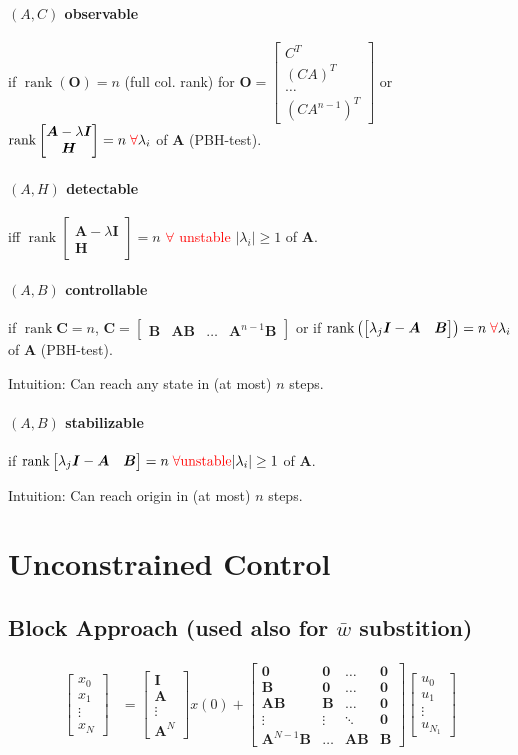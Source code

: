 \documentclass[landscape,a4paper,8pt]{scrartcl}
\newcommand{\remph}[1]{{\textcolor{red}{#1}}}
\newcommand\vA{\bm{A}}
\newcommand\vB{\bm{B}}
\newcommand\vC{\bm{C}}
\newcommand\vH{\bm{H}}
\newcommand\vI{\bm{I}}
\newcommand\vO{\bm{O}}
\newcommand{\Me}[1]{\begin{bmatrix}#1\end{bmatrix}} %
\DeclareMathOperator\rank{rank}
\begin{document}
\begin{multicols*}{3}
\paragraph{$(A,C)$ observable}
if $\rank(\vO) = n$ (full col. rank) for
$\vO = \Me{C^T \\ (CA)^T \\ \dots \\ (CA^{n-1})^T}$ or $\rank\Me{\vA-\lambda\vI \\ \vH} = n \; \remph{\forall} \lambda_i$ of $\vA$ (PBH-test).
\paragraph{$(A,H)$ detectable}
iff $\rank\Me{\vA-\lambda\vI \\ \vH} = n$ \remph{$\forall$ unstable} $|\lambda_i| \geq 1$ of $\vA$.

\paragraph{$(A,B)$ controllable}
if $\rank\vC = n$,
$\vC = \Me{\vB & \vA\vB & \dots & \vA^{n-1}\vB}$
or
if $\rank\left(\Me{\lambda_j \vI - \vA & \vB}\right) = n\; \remph{\forall} \lambda_i$ of $\vA$ (PBH-test).

Intuition: Can reach any state in (at most) $n$ steps.

\paragraph{$(A,B)$ stabilizable}
if $\rank\Me{\lambda_j \vI - \vA & \vB} = n \; \remph{\forall \text{unstable}} |\lambda_i| \geq 1$ of $\vA$.

Intuition: Can reach origin in (at most) $n$ steps.

\section{Unconstrained Control}
\subsection{Block Approach (used also for $\bar w$ substition)}
\begin{align*}
		\Me{x_0 \\ x_1 \\ \vdots \\ x_N } & = \Me{\vI \\ \vA \\ \vdots \\ \vA^N}x(0) + \Me{\bm 0 & \bm 0 & \dots & \bm 0 \\ \vB & \bm 0 & \dots & \bm 0 \\ \vA\vB & \vB & \dots & \bm 0 \\ \vdots & \vdots & \ddots & \bm 0 \\ \vA^{N-1}\vB & \dots & \vA\vB & \vB}\Me{u_0 \\ u_1 \\ \vdots \\ u_{N_1}}
\end{align*}


\end{multicols*}
\end{document}
